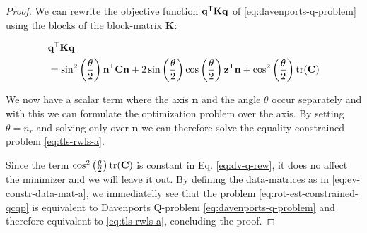 \begin{proof}
	
	We can rewrite the objective function $\mathbf{q}^{\mathsf{T}} \mathbf{K} \mathbf{q}$  of \ref{eq:davenports-q-problem} using the blocks of the block-matrix $\mathbf{K}$: 
	
	\begin{equation}
		\label{eq:dv-q-rew}
		\begin{aligned}
			&\mathbf{q}^{\mathsf{T}} \mathbf{K} \mathbf{q}\\
			&= \sin^2 \left(\frac{\theta}{2} \right) \mathbf{n}^{\mathsf{T}} \mathbf{C} \mathbf{n} + 2 \sin \left(\frac{\theta}{2} \right) \cos \left(\frac{\theta}{2} \right) \mathbf{z}^{\mathsf{T}} \mathbf{n} + \cos^2 \left(\frac{\theta}{2} \right) \textrm{tr}(\mathbf{C})
		\end{aligned}
	\end{equation}
	
	We now have a scalar term where the axis $\mathbf{n}$ and the angle $\theta$ occur separately and with this we can formulate the optimization problem over the axis. By setting $\theta = n_r$ and solving only over $\mathbf{n}$ we can therefore solve the equality-constrained problem \ref{eq:tls-rwls-a}.
	
	Since the term $ \cos^2 \left(\frac{\theta}{2} \right) \textrm{tr}(\mathbf{C})$ is constant in Eq. \ref{eq:dv-q-rew}, it does no affect the minimizer and we will leave it out. 
	By defining the data-matrices as in \ref{eq:ev-constr-data-mat-a}, we immediatelly see that the problem 
	\ref{eq:rot-est-constrained-qcqp} is equivalent to Davenports Q-problem \ref{eq:davenports-q-problem} and therefore equivalent to \ref{eq:tls-rwls-a}, concluding the proof.
\end{proof}	
